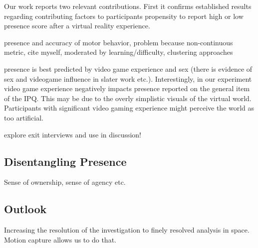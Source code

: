 Our work reports two relevant contributions. First it confirms established results regarding contributing factors to participants propensity to report high or low presence score after a virtual reality experience.


presence and accuracy of motor behavior, problem because non-continuous metric, cite myself, moderated by learning/difficulty, clustering approaches

presence is best predicted by video game experience and sex (there is evidence of sex and videogame influence in slater work etc.). Interestingly, in our experiment video game experience negatively impacts presence reported on the general item of the IPQ. This may be due to the overly simplistic visuals of the virtual world. Participants with significant video gaming experience might perceive the world as too artificial.

explore exit interviews and use in discussion!

\subsection{Disentangling Presence}

Sense of ownership, sense of agency etc.

\subsection{Outlook}

Increasing the resolution of the investigation to finely resolved analysis in space. Motion capture allows us to do that.

